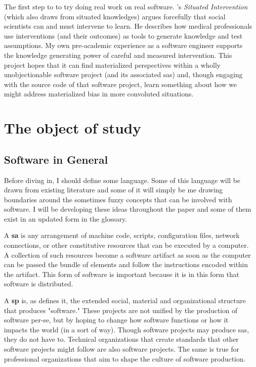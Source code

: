 \documentclass[a4paper,man,natbib,floatsintext]{apa6}
\begin{document}
  The first step to to try doing real work on real software. \citet{Zuiderent-Jerak2015-go}'s \textit{Situated Intervention} (which also draws from situated knowledges) argues forcefully that social scientists can and must intervene to learn. He describes how medical professionals use interventions (and their outcomes) as tools to generate knowledge and test assumptions. My own pre-academic experience as a software engineer supports the knowledge generating power of careful and measured intervention. This project hopes that it can find materialized perspectives within a wholly unobjectionable software project (and its associated \glspl{sa}) and, though engaging with the source code of that software project, learn something about how we might address materialized bias in more convoluted situations.




  \section{The object of study}
  \subsection{Software in General}
  Before diving in, I should define some language. Some of this language will be drawn from existing literature and some of it will simply be me drawing boundaries around the sometimes fuzzy concepts that can be involved with software. I will be developing these ideas throughout the paper and some of them exist in an updated form in the glossary.

  A \textbf{\gls{sa}} is any arrangement of machine code, scripts, configuration files, network connections, or other constitutive resources that can be executed by a computer. A collection of such resources become a software artifact as soon as the computer can be passed the bundle of elements and follow the instructions encoded within the artifact. This form of software is important because it is in this form that software is distributed.

  A \textbf{\gls{sp}} is, as \citet{Mackenzie2006-hb} defines it, the extended social, material and organizational structure that produces "software." These projects are not unified by the production of software per-se, but by hoping to change how software functions or how it impacts the world (in a \citet{Kitchin2011-af} sort of way). Though software projects may produce \glspl{sa}, they do not have to. Technical organizations that create standards that other software projects might follow are also software projects. The same is true for professional organizations that aim to shape the culture of software production. 
\end{document}
